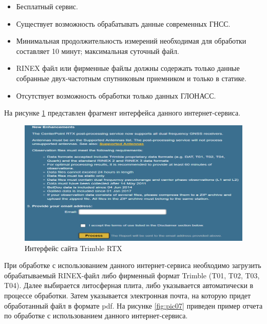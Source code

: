 \begin{itemize}
	\item Бесплатный сервис. 
	\item Существует возможность обрабатывать данные современных ГНСС.
	\item Минимальная продолжительность измерений необходимая для обработки составляет 10 минут; максимальная суточный файл.
	\item RINEX файл или фирменные файлы должны содержать только данные собранные двух-частотным спутниковым приемником и только в статике.
	\item Отсутствует возможность обработки только данных ГЛОНАСС.
\end{itemize}

На рисунке \cref{fig:pic06} представлен фрагмент интерфейса данного интернет-сервиса.

\begin{figure}[h]
	\centering
	\includegraphics[width=\linewidth]{images/pic06}
	\caption{Интерфейс сайта Trimble RTX}
	\label{fig:pic06}
\end{figure}

При обработке с использованием данного интернет-сервиса необходимо загрузить обрабатываемый RINEX-файл либо фирменный формат Trimble (T01, T02, T03, T04). Далее выбирается литосферная плита, либо указывается автоматически в процессе обработки. Затем указывается электронная почта, на которую придет обработанный файл в формате pdf. На рисунке \cref{fig:pic07} приведен пример отчета по обработке с использованием данного интернет-сервиса.

